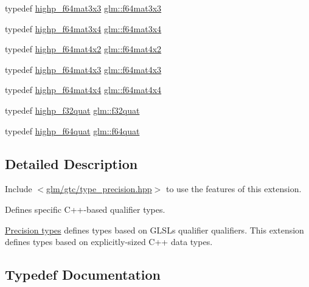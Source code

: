 \begin{DoxyCompactItemize}
\item 
typedef \hyperlink{fwd_8hpp_a86bcbb92333a03eacd7837df154b9e9e}{highp\+\_\+f64mat3x3} \hyperlink{group__gtc__type__precision_ga3b494201796c4200886e59f9695ecff0}{glm\+::f64mat3x3}
\item 
typedef \hyperlink{fwd_8hpp_a6de664fd8df90975b7b61eb12fc0b88f}{highp\+\_\+f64mat3x4} \hyperlink{group__gtc__type__precision_gaddb7f46e5a007c31348305de542e0d52}{glm\+::f64mat3x4}
\item 
typedef \hyperlink{fwd_8hpp_aa5ce60f76498ee115bfff604b011f268}{highp\+\_\+f64mat4x2} \hyperlink{group__gtc__type__precision_ga704001c2ed5838498ff61f55995fed3a}{glm\+::f64mat4x2}
\item 
typedef \hyperlink{fwd_8hpp_a3075aae294d1cf2cb519a0f9abe36b44}{highp\+\_\+f64mat4x3} \hyperlink{group__gtc__type__precision_gaf9b2bfbb2c79a39c693e2ab2bedf30e5}{glm\+::f64mat4x3}
\item 
typedef \hyperlink{fwd_8hpp_a62d8193501bb25dd5cfb8c271f52130a}{highp\+\_\+f64mat4x4} \hyperlink{group__gtc__type__precision_ga5fc21633b1546e4599609c47b4c8dac4}{glm\+::f64mat4x4}
\item 
typedef \hyperlink{fwd_8hpp_af8fed7ddfeb05fe07ba9d661644b8a47}{highp\+\_\+f32quat} \hyperlink{group__gtc__type__precision_gac59c4d798396552e4bbb866b3d8a2f18}{glm\+::f32quat}
\item 
typedef \hyperlink{fwd_8hpp_a50e023f42b7d0e2f40eff32ace71ae1a}{highp\+\_\+f64quat} \hyperlink{group__gtc__type__precision_ga5b54d7b36fbee5e271f73e6ed74e7172}{glm\+::f64quat}
\end{DoxyCompactItemize}


\subsection{Detailed Description}
Include $<$\hyperlink{type__precision_8hpp}{glm/gtc/type\+\_\+precision.\+hpp}$>$ to use the features of this extension.

Defines specific C++-\/based qualifier types.

\hyperlink{group__core__precision}{Precision types} defines types based on G\+L\+SL\textquotesingle{}s qualifier qualifiers. This extension defines types based on explicitly-\/sized C++ data types. 

\subsection{Typedef Documentation}
\mbox{\label{group__gtc__type__precision_ga0ec999b57f5330d9021256e96038df04}} 
